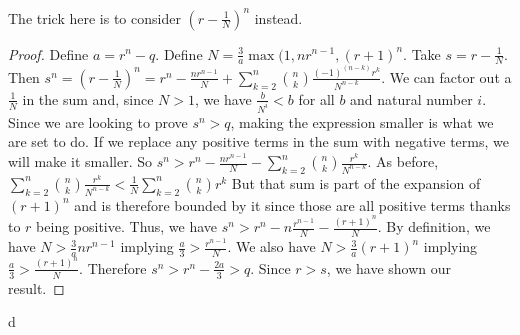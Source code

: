\documentclass[12pt]{article}
\theoremstyle{remark}
\begin{document}
The trick here is to consider $(r-\tfrac{1}{N})^n$ instead. 

\begin{proof}
Define $a = r^n - q$. Define $N = \tfrac{3}{a} \max(1,n r^{n-1}, (r+1)^n$.  Take $s = r - \tfrac{1}{N}$. Then $s^n = (r- \tfrac{1}{N})^n = r^n - \tfrac{n r^{n-1}}{N} + \sum_{k=2}^{n} \binom{n}{k} \tfrac{ (-1)^(n-k) r^k}{N^{n-k}}$. We can factor out a $\tfrac{1}{N}$ in the sum and, since $N > 1$, we have $\tfrac{b}{N^i} < b$ for all $b$ and natural number $i$. Since we are looking to prove $s^n > q$, making the expression smaller is what we are set to do. If we replace any positive terms in the sum with negative terms, we will make it smaller. So $s^n > r^n - \tfrac{n r^{n-1}}{N} - \sum_{k=2}^{n} \binom{n}{k} \tfrac{r^k}{N^{n-k}}$. As before, $\sum_{k=2}^{n} \binom{n}{k} \tfrac{r^k}{N^{n-k}} < \tfrac{1}{N} \sum_{k=2}^{n} \binom{n}{k} r^k$  But that sum is part of the expansion of $(r+1)^n$ and is therefore bounded by it since those are all positive terms thanks to $r$ being positive. Thus, we have $s^n > r^n - n \tfrac{r^{n-1}}{N} - \tfrac{ (r+1)^n }{N}$.  By definition, we have $N > \tfrac{3}{a} n r^{n-1}$ implying $\tfrac{a}{3} > \tfrac{ r^{n-1}}{N}$. We also have $N > \tfrac{3}{a} (r+1)^n$ implying $\tfrac{a}{3} > \tfrac{(r+1)^n}{N}$. Therefore $s^n > r^n - \tfrac{2 a}{3} > q$. Since $r>s$, we have shown our result. 
\end{proof}



\begin{thebibliography}{28.}
d

\end{thebibliography}
\end{document}
